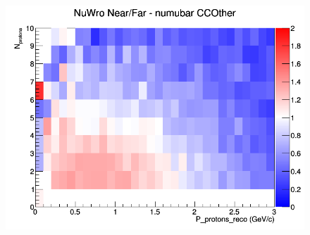 \begin{figure}[h]
\endminipage
{}
\includegraphics[width=\linewidth]{eff_N_P/LAr/protons/ratios/CCOther_NuWro_numubar_NF_N_P.png}
\endminipage
\newline
\end{figure}
\clearpage
